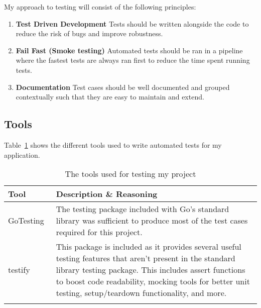 
My approach to testing will consist of the following principles:

\begin{enumerate}
  \item \textbf{Test Driven Development} Tests should be written alongside the code to reduce the risk of bugs and improve robustness.
  \item \textbf{Fail Fast (Smoke testing)} Automated tests should be ran in a pipeline where the fastest tests are always ran first to reduce the time spent running tests.
  \item \textbf{Documentation} Test cases should be well documented and grouped contextually such that they are easy to maintain and extend.
\end{enumerate}

\subsection*{Tools}

Table~\ref{tab:tools-testing} shows the different tools used to write automated tests for my application.

\begin{longtable}{p{} p{}}
  \toprule
  \textbf{Tool} & \textbf{Description \& Reasoning}
  \\\midrule\midrule
  Go\newline Testing~\cite{noauthor_testing_nodate-1}
  & The testing package included with Go's standard library was sufficient to produce most of the test cases required for this project.
  \\
  testify~\cite{noauthor_testify_2023}
  & This package is included as it provides several useful testing features that aren't present in the standard library testing package. This includes assert functions to boost code readability, mocking tools for better unit testing, setup/teardown functionality, and more.
  \\\bottomrule\bottomrule
  \caption{The tools used for testing my project}
  \label{tab:tools-testing}
\end{longtable}
